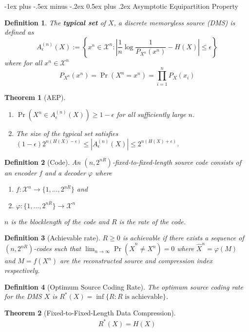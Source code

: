 \documentclass[frenchspacing,9pt,landscape,a4paper]{article}
\makeatletter
\renewcommand{\section}{\@startsection{section}{1}{0mm}%
                                {-1ex plus -.5ex minus -.2ex}%
                                {0.5ex plus .2ex}%
                                {\normalfont\large\bfseries}}
\newcommand{\abs}[1]{\left\lvert #1 \right\rvert}
\DeclareMathOperator{\pr}{Pr}
\newtheorem*{thm}{Theorem}
\newtheorem*{defn}{Definition}
\makeatother
\begin{document}
\begin{multicols}{4}
\section{Asymptotic Equipartition Property}
\begin{defn}
    The \textbf{typical set} of $X$, a discrete memoryless source (DMS) is defined as 
    \[A_\epsilon^{(n)}(X):=\left\{x^n\in\mathcal{X}^n:\abs{\frac{1}{n}\log
    \frac{1}{P_{X^n}(x^n)}-H(X)}\leq\epsilon\right\}\] where for all $x^n\in\mathcal{X}^n$
    \[P_{X^n}(x^n)=\pr(X^n=x^n)=\prod_{i=1}^n P_X(x_i)\]
\end{defn}
\begin{thm}[AEP]
    \begin{enumerate}
        \item $\pr(X^n\in A_\epsilon^{(n)}(X))\geq 1-\epsilon$ for all sufficiently large  $n$.
        \item The size of the typical set satisfies
            $(1-\epsilon)2^{n(H(X)-\epsilon)}\leq\abs{A_\epsilon^{(n)}(X)}\leq 2^{n(H(X)+\epsilon)}$.
    \end{enumerate}
\end{thm}
\begin{defn}[Code]
    An $(n,2^{nR})$-fixed-to-fixed-length source code consists of an encoder  $f$ and a decoder  $\varphi$
    where
    \begin{enumerate}
        \item $f:\mathcal{X}^n\to\{1,\dots,2^{nR}\}$ and
        \item  $\varphi:\{1,\dots,2^{nR}\}\to\mathcal{X}^n$
    \end{enumerate} $n$ is the blocklength of the code and  $R$ is the rate of the code.
\end{defn}
\begin{defn}[Achievable rate]
    $R\geq 0$ is achievable if there exists a sequence of  $(n,2^{nR})$-codes such that
    $\lim_{n\to\infty}\pr(\hat{X}^n\neq X^n)=0$ where  $\hat{X}^n=\varphi(M)$ and  $M=f(X^n)$ are the
    reconstructed source and compression index respectively.
\end{defn}
\begin{defn}[Optimum Source Coding Rate]
    The optimum source coding rate for the DMS $X$ is $R^*(X)=\inf\{R:R\text{ is achievable}\}$.
\end{defn}
\begin{thm}[Fixed-to-Fixed-Length Data Compression]
    \begin{align*}
        R^*(X)=H(X) 
    \end{align*}

\end{thm}
\end{multicols}
\end{document}

